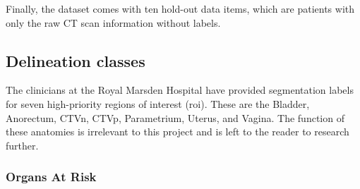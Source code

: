 \documentclass[12pt,twoside]{report}
\begin{document}
Finally, the dataset comes with ten hold-out data items, which are patients with only the raw CT scan information without labels.





\subsection{Delineation classes}

The clinicians at the Royal Marsden Hospital have provided segmentation labels for seven high-priority regions of interest (roi). These are the Bladder, Anorectum, CTVn, CTVp, Parametrium, Uterus, and Vagina. The function of these anatomies is irrelevant to this project and is left to the reader to research further.



\subsubsection{Organs At Risk}\label{sec:data-organs-at-risk}
\end{document}
